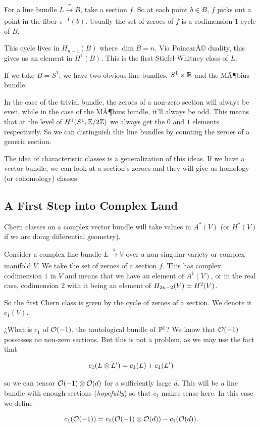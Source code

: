 \documentclass[12pt]{memoir}
\begin{document}
\begin{Ex}
    For a line bundle \(L\xrightarrow[]{\pi}B\), take a section \(f\). So at each point \(b\in B\), \(f\) picks out a point in the fiber \(\pi^{-1}(b)\). Usually the set of zeroes of \(f\) is a codimension \(1\) cycle of \(B\).
    \begin{center}
    \end{center}
    This cycle lives in \(H_{n-1}(B)\) where \(\dim B=n\). Via PoincarÃ© duality, this gives us an element in \(H^1(B)\). This is the first Stiefel-Whitney class of \(L\).\par
    If we take \(B=S^1\), we have two obvious line bundles, \(S^1\times\mathbb{R}\) and the MÃ¶bius bundle.
    \begin{center}
    \end{center}
    In the case of the trivial bundle, the zeroes of a non-zero section will always be even, while in the case of the MÃ¶bius bundle, it'll always be odd. This means that at the level of \(H^{1}(S^1,\mathbb{Z}/2\mathbb{Z})\) we always get the \(0\) and \(1\) elements respectively. So we can distinguish this line bundles by counting the zeroes of a generic section.
\end{Ex}

The idea of characteristic classes is a generalization of this ideas. If we have a vector bundle, we can look at a section's zeroes and they will give us homology (or cohomology) classes.

\subsection{A First Step into Complex Land}

Chern classes on a complex vector bundle will take values in \(A^*(V)\) (or \(H^\ast(V)\) if we are doing differential geometry).\par
Consider a complex line bundle \(L\xrightarrow[]{\pi}V\) over a non-singular variety or complex manifold \(V\). We take the set of zeroes of a section \(f\). This has complex codimension \(1\) in \(V\) and means that we have an element of \(A^1(V)\), or in the real case, codimension \(2\) with it being an element of \(H_{2n-2}(V)\simeq H^2(V)\).\par
So the first Chern class is given by the cycle of zeroes of a section. We denote it \(c_1(V)\).

\begin{Ex}
    ¿What is \(c_1\) of \(\mathcal{O}(-1)\), the tautological bundle of \(\mathbb{P}^1\)? We know that \(\mathcal{O}(-1)\) possesses no non-zero sections. But this is not a problem, as we may use the fact that

    \[c_1(L\otimes L')=c_1(L)+c_1(L')\]

    so we can tensor \(\mathcal{O}(-1)\otimes\mathcal{O}(d)\) for a sufficiently large \(d\). This will be a line bundle with enough sections (\emph{hopefully}) so that \(c_1\) makes sense here. In this case we define

    \[c_1(\mathcal{O}(-1))=c_1(\mathcal{O}(-1)\otimes\mathcal{O}(d))-c_1(\mathcal{O}(d)).\]

\end{Ex}
\end{document}
